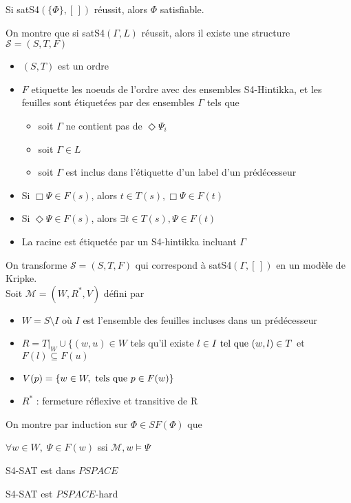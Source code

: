 \documentclass[10pt,a4paper]{article}
\newcommand{\M}{\mathcal{M}}
\begin{document}
\begin{thm}
 Si satS4$(\{\Phi\}, [\,])$ réussit, alors $\Phi$ satisfiable.
\end{thm}

\begin{dem}
  On montre que si  satS4$(\Gamma, L)$ réussit, alors il existe une structure $\mathcal{S} = (S, T, F)$ \tq[le]
\begin{itemize}
 \item $(S,T)$ est un ordre
 \item $F$ etiquette les noeuds de l'ordre avec des ensembles S4-Hintikka, et les feuilles sont étiquetées par des ensembles $\Gamma$ tels que
\begin{itemize}
 \item soit $\Gamma$ ne contient pas de $\Diamond \Psi_i$
 \item soit $\Gamma \in L$
 \item soit $\Gamma$ est inclus dans l'étiquette d'un label d'un prédécesseur
\end{itemize}
\item Si $\Box \Psi \in F(s)$, alors $t \in T(s), \Box \Psi \in F(t)$
\item Si $\Diamond \Psi \in F(s)$, alors $\exists t \in T(s),  \Psi \in F(t)$
\item La racine est étiquetée par un S4-hintikka incluant $\Gamma$
\end{itemize}
 On transforme $\mathcal{S} = (S, T, F)$ qui correspond à satS4$(\Gamma, [\,])$ en un modèle de Kripke.\\
Soit $\mathcal{M} = (W, R^*, V)$ défini par 
\begin{itemize}
 \item $W = S \setminus I$ où $I$ est l'ensemble des feuilles incluses dans un prédécesseur
 \item $R = T | _W \cup \{ (w,u) \in W$ tels qu'il existe $ l \in I \tq (w,l) \in T$ et $F(l) \subseteq F(u)$
 \item $V(p) =  \{w \in W, \tq[s] p \in F(w) \}$
 \item $R^*$ : fermeture réflexive et transitive de R
\end{itemize}
On montre par induction sur $\Phi \in SF(\Phi)$ que 

$\forall w \in W, \;\Psi \in F(w)$ ssi $\M,w \models \Psi$
\end{dem}

\begin{thm}
 S4-SAT est dans $PSPACE$
\end{thm}
\begin{thm}
 S4-SAT est $PSPACE$-hard
\end{thm}
\end{document}
